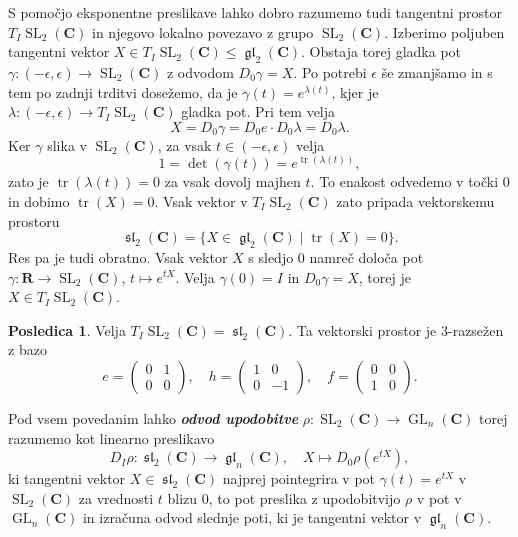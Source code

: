 \documentclass[11pt]{book}
\def\RR{\mathbf{R}}
\def\CC{\mathbf{C}}
\DeclareMathOperator\tr{tr}
\DeclareMathOperator\GL{GL}
\DeclareMathOperator\glfrak{\mathfrak{gl}}
\DeclareMathOperator\slfrak{\mathfrak{sl}}
\DeclareMathOperator\SL{SL}
\def\definicija{\color{rdeca}\bf\em}
\theoremstyle{definition}
\theoremstyle{zgled}
\theoremstyle{odprtproblem}
\theoremstyle{domacanaloga}
\theoremstyle{izrek}
\newtheorem*{posledica}{Posledica}
\begin{document}
S pomočjo eksponentne preslikave lahko dobro razumemo tudi tangentni prostor $T_I \SL_2(\CC)$ in njegovo lokalno povezavo z grupo $\SL_2(\CC)$. Izberimo poljuben tangentni vektor $X \in T_I \SL_2(\CC) \leq \glfrak_2(\CC)$. Obstaja torej gladka pot $\gamma \colon (-\epsilon, \epsilon) \to \SL_2(\CC)$ z odvodom $D_0 \gamma = X$. Po potrebi $\epsilon$ še zmanjšamo in s tem po zadnji trditvi dosežemo, da je $\gamma(t) = e^{\lambda(t)}$, kjer je $\lambda \colon (-\epsilon, \epsilon) \to T_I \SL_2(\CC)$ gladka pot. Pri tem velja
\[
    X = D_0 \gamma
    = D_0 e \cdot D_0 \lambda
    = D_0 \lambda.
\]
Ker $\gamma$ slika v $\SL_2(\CC)$, za vsak $t \in (- \epsilon, \epsilon)$ velja 
\[
    1 = \det (\gamma(t)) = e^{\tr(\lambda(t))},
\]
zato je $\tr(\lambda(t)) = 0$ za vsak dovolj majhen $t$. To enakost odvedemo v točki $0$ in dobimo $\tr(X) = 0$. Vsak vektor v $T_I \SL_2(\CC)$ zato pripada vektorskemu prostoru
\[
    \textstyle \slfrak_2(\CC) = \{ X \in \glfrak_2(\CC) \mid \tr(X) = 0 \}.
\]
Res pa je tudi obratno. Vsak vektor $X$ s sledjo $0$ namreč določa pot $\gamma \colon \RR \to \SL_2(\CC)$, $t \mapsto e^{tX}$. Velja $\gamma(0) = I$ in $D_0 \gamma = X$, torej je $X \in T_I \SL_2(\CC)$.

\begin{posledica}
Velja $T_I \SL_2(\CC) = \slfrak_2(\CC)$. Ta vektorski prostor je $3$-razsežen z bazo
\[
    e = \begin{pmatrix}
        0 & 1 \\ 0 & 0
    \end{pmatrix},
    \quad
    h = \begin{pmatrix}
        1 & 0 \\ 0 & -1
    \end{pmatrix},
    \quad
    f = \begin{pmatrix}
        0 & 0 \\ 1 & 0
    \end{pmatrix}.
\]
\end{posledica}

Pod vsem povedanim lahko {\definicija odvod upodobitve} $\rho \colon \SL_2(\CC) \to \GL_n(\CC)$ torej razumemo kot linearno preslikavo
\[
    {\textstyle D_I \rho \colon \slfrak_2(\CC) \to \glfrak_n(\CC),} \quad
    X \mapsto D_0 \rho(e^{tX}),
\]
ki tangentni vektor $X \in \slfrak_2(\CC)$ najprej pointegrira v pot $\gamma(t) = e^{tX}$ v $\SL_2(\CC)$ za vrednosti $t$ blizu $0$, to pot preslika z upodobitvijo $\rho$ v pot v $\GL_n(\CC)$ in izračuna odvod slednje poti, ki je tangentni vektor v $\glfrak_n(\CC)$.
\end{document}
